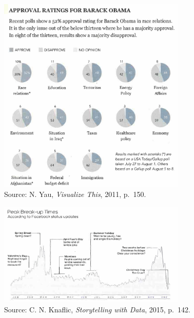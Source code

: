 \documentclass[
  letterpaper,
  DIV=11,
  numbers=noendperiod]{scrreprt}
\begin{document}
\hfill\break
\hfill\break
\hfill\break

\begin{figure}[H]

{\centering \includegraphics[width=0.8\textwidth,height=\textheight]{src/../images/obama1.png}

}

\caption{Source: N. Yau, \emph{Visualize This}, 2011, p.~150.}

\end{figure}%

\hfill\break
\hfill\break
\hfill\break

\begin{figure}[H]

{\centering \includegraphics[width=0.8\textwidth,height=\textheight]{src/../images/breakup.png}

}

\caption{Source: C. N. Knaflic, \emph{Storytelling with Data}, 2015,
p.~142.}

\end{figure}%
\end{document}
